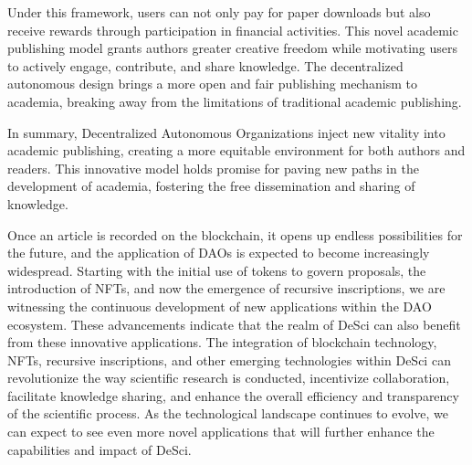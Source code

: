 \documentclass[lettersize,journal]{IEEEtran}
\begin{document}
Under this framework, users can not only pay for paper downloads but also receive rewards through participation in financial activities. This novel academic publishing model grants authors greater creative freedom while motivating users to actively engage, contribute, and share knowledge. The decentralized autonomous design brings a more open and fair publishing mechanism to academia, breaking away from the limitations of traditional academic publishing.

In summary, Decentralized Autonomous Organizations inject new vitality into academic publishing, creating a more equitable environment for both authors and readers. This innovative model holds promise for paving new paths in the development of academia, fostering the free dissemination and sharing of knowledge.

Once an article is recorded on the blockchain, it opens up endless possibilities for the future, and the application of DAOs is expected to become increasingly widespread. Starting with the initial use of tokens to govern proposals, the introduction of NFTs, and now the emergence of recursive inscriptions, we are witnessing the continuous development of new applications within the DAO ecosystem. 
These advancements indicate that the realm of DeSci can also benefit from these innovative applications. The integration of blockchain technology, NFTs, recursive inscriptions, and other emerging technologies within DeSci can revolutionize the way scientific research is conducted, incentivize collaboration, facilitate knowledge sharing, and enhance the overall efficiency and transparency of the scientific process. As the technological landscape continues to evolve, we can expect to see even more novel applications that will further enhance the capabilities and impact of DeSci.






\newpage
\end{document}
